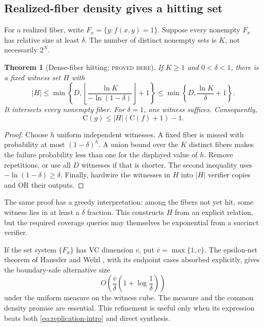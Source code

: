 \documentclass[11pt]{article}
\newtheorem{theorem}{Theorem}[section]
\theoremstyle{definition}
\theoremstyle{remark}
\newcommand{\C}{\mathrm C}
\newcommand{\status}[1]{\textsc{#1}}
\begin{document}
\subsection{Realized-fiber density gives a hitting set}

For a realized fiber, write $F_x=\{y:f(x,y)=1\}$.  Suppose every nonempty
$F_x$ has relative size at least $\delta$.  The number of distinct nonempty
sets is $K$, not necessarily $2^N$.

\begin{theorem}[Dense-fiber hitting; \status{proved here}]
\label{thm:dense-hitting}
If $K\ge1$ and $0<\delta<1$, there is a fixed witness set $H$ with
\[
 |H|\le
 \min\left\{
   D,
   \left\lfloor\frac{\ln K}{-\ln(1-\delta)}\right\rfloor+1
 \right\}
 \le \min\left\{D,\frac{\ln K}{\delta}+1\right\}.
 \tag{3.4}\label{eq:dense-hitting}
\]
It intersects every nonempty fiber.  For $\delta=1$, one witness suffices.
Consequently,
\[
  \C(g)\le |H|(\C(f)+1)-1.
  \tag{3.5}\label{eq:dense-circuit}
\]
\end{theorem}

\begin{proof}
Choose $h$ uniform independent witnesses.  A fixed fiber is missed with
probability at most $(1-\delta)^h$.  A union bound over the $K$ distinct
fibers makes the failure probability less than one for the displayed value of
$h$.  Remove repetitions, or use all $D$ witnesses if that is shorter.  The
second inequality uses $-\ln(1-\delta)\ge\delta$.  Finally, hardwire the
witnesses in $H$ into $|H|$ verifier copies and OR their outputs.
\end{proof}

The same proof has a greedy interpretation: among the fibers not yet hit,
some witness lies in at least a $\delta$ fraction.  This constructs $H$ from
an explicit relation, but the required coverage queries may themselves be
exponential from a succinct verifier.

If the set system $\{F_x\}$ has VC dimension $v$, put
$\bar v=\max\{1,v\}$.  The epsilon-net theorem of Haussler and Welzl
\cite{HausslerWelzl1987}, with its endpoint cases absorbed explicitly, gives
the boundary-safe alternative size
\[
  O\!\left(\frac{\bar v}{\delta}
    \left(1+\log\frac1\delta\right)\right)
  \tag{3.6}\label{eq:vc-net}
\]
under the uniform measure on the witness cube.  The measure and the common
density promise are essential.  This refinement is useful only when its
expression beats both \eqref{eq:replication-intro} and direct synthesis.
\end{document}
